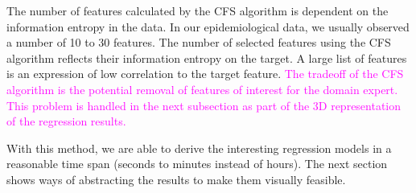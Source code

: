 \documentclass[journal]{style/vgtc} 			          %
\newcommand{\magenta}[1]{\textcolor{magenta}{#1}}
\begin{document}
The number of features calculated by the CFS algorithm is dependent on the information entropy in the data.
In our epidemiological data, we usually observed a number of 10 to 30 features.
The number of selected features using the CFS algorithm reflects their information entropy on the target.
A large list of features is an expression of low correlation to the target feature.
\magenta{
The tradeoff of the CFS algorithm is the potential removal of features of interest for the domain expert.
This problem is handled in the next subsection as part of the 3D representation of the regression results.
}

With this method, we are able to derive the interesting regression models in a reasonable time span (seconds to minutes instead of hours).
The next section shows ways of abstracting the results to make them visually feasible.

\end{document}
